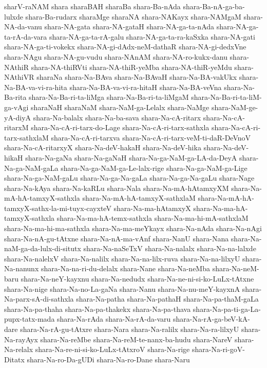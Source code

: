{sharV-raNAM
shara
sharaBAH
sharaBa
shara-Ba-nAda
shara-Ba-nA-ga-ba-lulxde
shara-Ba-rudarx
sharaMge
sharaNA
shara-NAKayx
shara-NAMgaM
shara-NA-da-vanu
shara-NA-gata
shara-NA-gataH
shara-NA-ga-ta-nAda
shara-NA-ga-ta-rA-da-vara
shara-NA-ga-ta-rA-galu
shara-NA-ga-ta-ra-kaSxka
shara-NA-gati
shara-NA-ga-ti-vokekx
shara-NA-gi-dAdx-neM-dathaR
shara-NA-gi-dedxVne
shara-NAgu
shara-NA-gu-vudu
shara-NAnAM
shara-NA-ro-kukx-danu
shara-NAthiR
shara-NA-thiRVti
shara-NA-thiR-yeMba
shara-NA-thiR-yeMdu
shara-NAthiVR
sharaNa
shara-Na-BAva
shara-Na-BAvaH
shara-Na-BA-vakUkx
shara-Na-BA-va-vi-ra-hita
shara-Na-BA-va-vi-ra-hitaH
shara-Na-BA-veVna
shara-Na-Ba-rita
shara-Na-Ba-ri-ta-liMga
shara-Na-Ba-ri-ta-liMgaM
shara-Na-Ba-ri-ta-liM-ga-vAgi
sharaNaH
sharaNaM
shara-NaM-ga-Lelalx
shara-NaMge
shara-NaM-ge-yA-diyA
shara-Na-balalx
shara-Na-ba-sava
shara-Na-cA-ritarx
shara-Na-cA-ritarxM
shara-Na-cA-ri-tarx-do-Lage
shara-Na-cA-ri-tarx-sathxla
shara-Na-cA-ri-tarx-sathxlaM
shara-Na-cA-ri-tarxva
shara-Na-cA-ri-tarx-veM-ti-daR-DeVnoV
shara-Na-cA-ritarxyX
shara-Na-deV-hakaH
shara-Na-deV-hika
shara-Na-deV-hikaH
shara-Na-gaNa
shara-Na-gaNaH
shara-Na-ga-NaM-ga-LA-da-DeyA
shara-Na-ga-NaM-gaLa
shara-Na-ga-NaM-ga-Le-lalx-rige
shara-Na-ga-NaM-ga-Lige
shara-Na-ga-NaM-gaLu
shara-Na-ga-Na-gaLa
shara-Na-ga-Na-gaLu
shara-Nage
shara-Na-kAya
shara-Na-kaRLu
shara-Nala
shara-Na-mA-hAtamxyXM
shara-Na-mA-hA-tamxyX-sathxla
shara-Na-mA-hA-tamxyX-sathxlaM
shara-Na-mA-hA-tamxyX-sathx-la-mi-tuyx-cayxteV
shara-Na-ma-hAtamxyX
shara-Na-ma-hA-tamxyX-sathxla
shara-Na-ma-hA-temx-sathxla
shara-Na-ma-hi-mA-sathxlaM
shara-Na-ma-hi-ma-sathxla
shara-Na-ma-meYkayx
shara-Na-nAda
shara-Na-nAgi
shara-Na-nA-gu-tAtxne
shara-Na-nA-ma-vAnf
shara-NanU
shara-Nana
shara-Na-naM-ga-da-lulx-di-situtx
shara-Na-naSeTxV
shara-Na-nalalx
shara-Na-na-lalxde
shara-Na-nalelxV
shara-Na-nalilx
shara-Na-na-lilx-ruva
shara-Na-na-lilxyU
shara-Na-nanunx
shara-Na-na-ri-du-delalx
shara-Nane
shara-Na-neMba
shara-Na-neM-baru
shara-Na-neY-kayxnu
shara-Na-nedudx
shara-Na-ne-ni-si-ko-LuLx-tAtxne
shara-Na-nige
shara-Na-no-La-gaNa
shara-Nanu
shara-Na-nu-meY-kayxnA
shara-Na-parx-sA-di-sathxla
shara-Na-patha
shara-Na-pathaH
shara-Na-pa-thaM-gaLa
shara-Na-pa-thaha
shara-Na-pa-thakekx
shara-Na-pa-thava
shara-Na-pa-ti-ga-La-pupx-tatx-mada
shara-Na-rAda
shara-Na-rA-da-varu
shara-Na-rA-ga-beV-kA-dare
shara-Na-rA-gu-tAtxre
shara-Nara
shara-Na-ralilx
shara-Na-ra-lilxyU
shara-Na-rayAyx
shara-Na-reMbe
shara-Na-reM-te-nanx-ba-hudu
shara-NareV
shara-Na-relalx
shara-Na-re-ni-si-ko-LuLx-tAtxroV
shara-Na-rige
shara-Na-ri-goV-Ditatx
shara-Na-ro-Da-gUDi
shara-Na-ro-Dane
shara-Naru
}
